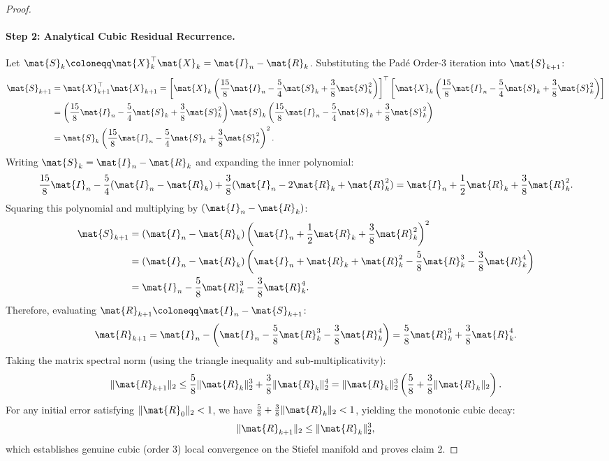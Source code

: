 \begin{proof}
\paragraph{Step 2: Analytical Cubic Residual Recurrence.}
Let $\mat{S}_k \coloneqq \mat{X}_k^\top \mat{X}_k = \mat{I}_n - \mat{R}_k$. Substituting the Padé Order-3 iteration into $\mat{S}_{k+1}$:
\begin{align}
\mat{S}_{k+1} &= \mat{X}_{k+1}^\top \mat{X}_{k+1} = \left[ \mat{X}_k \left( \frac{15}{8}\mat{I}_n - \frac{5}{4}\mat{S}_k + \frac{3}{8}\mat{S}_k^2 \right) \right]^\top \left[ \mat{X}_k \left( \frac{15}{8}\mat{I}_n - \frac{5}{4}\mat{S}_k + \frac{3}{8}\mat{S}_k^2 \right) \right] \nonumber \\
&= \left( \frac{15}{8}\mat{I}_n - \frac{5}{4}\mat{S}_k + \frac{3}{8}\mat{S}_k^2 \right) \mat{S}_k \left( \frac{15}{8}\mat{I}_n - \frac{5}{4}\mat{S}_k + \frac{3}{8}\mat{S}_k^2 \right) \nonumber \\
&= \mat{S}_k \left( \frac{15}{8}\mat{I}_n - \frac{5}{4}\mat{S}_k + \frac{3}{8}\mat{S}_k^2 \right)^2.
\end{align}
Writing $\mat{S}_k = \mat{I}_n - \mat{R}_k$ and expanding the inner polynomial:
\begin{equation}
\frac{15}{8}\mat{I}_n - \frac{5}{4}(\mat{I}_n - \mat{R}_k) + \frac{3}{8}(\mat{I}_n - 2\mat{R}_k + \mat{R}_k^2) = \mat{I}_n + \frac{1}{2}\mat{R}_k + \frac{3}{8}\mat{R}_k^2.
\end{equation}
Squaring this polynomial and multiplying by $(\mat{I}_n - \mat{R}_k)$:
\begin{align}
\mat{S}_{k+1} &= (\mat{I}_n - \mat{R}_k) \left( \mat{I}_n + \frac{1}{2}\mat{R}_k + \frac{3}{8}\mat{R}_k^2 \right)^2 \nonumber \\
&= (\mat{I}_n - \mat{R}_k) \left( \mat{I}_n + \mat{R}_k + \mat{R}_k^2 - \frac{5}{8}\mat{R}_k^3 - \frac{3}{8}\mat{R}_k^4 \right) \nonumber \\
&= \mat{I}_n - \frac{5}{8}\mat{R}_k^3 - \frac{3}{8}\mat{R}_k^4.
\end{align}
Therefore, evaluating $\mat{R}_{k+1} \coloneqq \mat{I}_n - \mat{S}_{k+1}$:
\begin{equation}
\mat{R}_{k+1} = \mat{I}_n - \left( \mat{I}_n - \frac{5}{8} \mat{R}_k^3 - \frac{3}{8} \mat{R}_k^4 \right) = \frac{5}{8} \mat{R}_k^3 + \frac{3}{8} \mat{R}_k^4.
\end{equation}
Taking the matrix spectral norm (using the triangle inequality and sub-multiplicativity):
\begin{equation}
\|\mat{R}_{k+1}\|_2 \le \frac{5}{8}\|\mat{R}_k\|_2^3 + \frac{3}{8}\|\mat{R}_k\|_2^4 = \|\mat{R}_k\|_2^3 \left( \frac{5}{8} + \frac{3}{8}\|\mat{R}_k\|_2 \right).
\end{equation}
For any initial error satisfying $\|\mat{R}_0\|_2 < 1$, we have $\frac{5}{8} + \frac{3}{8}\|\mat{R}_k\|_2 < 1$, yielding the monotonic cubic decay:
\begin{equation}
\|\mat{R}_{k+1}\|_2 \le \|\mat{R}_k\|_2^3,
\end{equation}
which establishes genuine cubic (order 3) local convergence on the Stiefel manifold and proves claim 2.


\end{proof}
